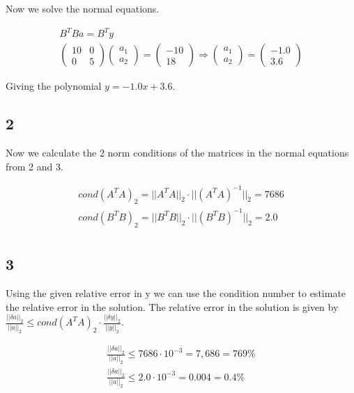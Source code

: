 \documentclass[a4paper]{article}
\begin{document}
Now we solve the normal equations.

\begin{align*}
    B^TBa = B^Ty\\
    \begin{pmatrix}
        10 & 0\\
        0 & 5
    \end{pmatrix} \begin{pmatrix}
        a_1\\
        a_2
    \end{pmatrix} = \begin{pmatrix}
        -10\\
        18
    \end{pmatrix} \Rightarrow \begin{pmatrix}
        a_1\\
        a_2
    \end{pmatrix} = \begin{pmatrix}
        -1.0\\
        3.6
    \end{pmatrix}
\end{align*}

Giving the polynomial $y = -1.0x + 3.6$.

\subsection*{2}

Now we calculate the 2 norm conditions of the matrices in the normal equations from 2 and 3.

\begin{align*}
    cond(A^TA)_2 = ||A^TA||_2 \cdot ||(A^TA)^{-1}||_2 = 7686\\
    cond(B^TB)_2 = ||B^TB||_2 \cdot ||(B^TB)^{-1}||_2 = 2.0\\
\end{align*}

\subsection*{3}

Using the given relative error in y we can use the condition number to estimate the relative error in the solution. The relative error in the solution is given by $\frac{||\delta a||_2}{||a||_2} \leq cond(A^TA)_2 \cdot \frac{||\delta y||_2}{||y||_2}$. 

\begin{align*}
    \frac{||\delta a||_2}{||a||_2} \leq 7686 \cdot 10^{-3} = 7,686 = 769 \% \\
    \frac{||\delta a||_2}{||a||_2} \leq 2.0 \cdot 10^{-3} = 0.004 = 0.4 \%
\end{align*}
\end{document}
